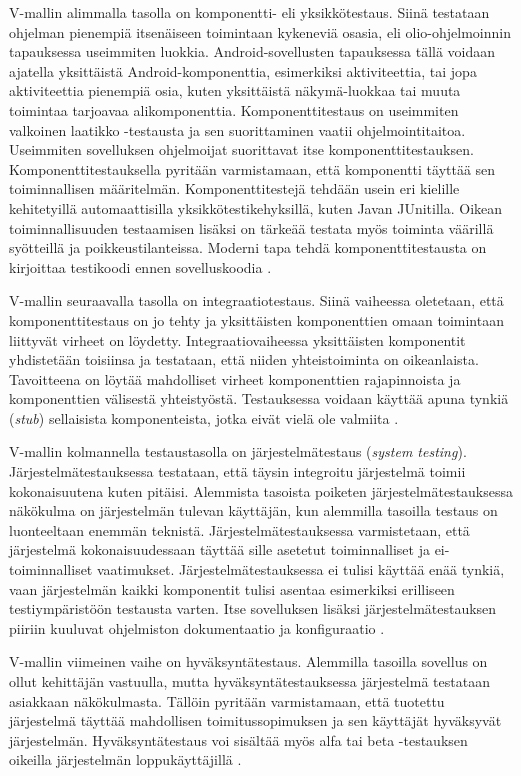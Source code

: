 V-mallin alimmalla tasolla on komponentti- eli yksikkötestaus. Siinä testataan ohjelman pienempiä itsenäiseen toimintaan kykeneviä osasia, eli olio-ohjelmoinnin tapauksessa useimmiten luokkia. Android-sovellusten tapauksessa tällä voidaan ajatella yksittäistä Android-komponenttia, esimerkiksi aktiviteettia, tai jopa aktiviteettia pienempiä osia, kuten yksittäistä näkymä-luokkaa tai muuta toimintaa tarjoavaa alikomponenttia. Komponenttitestaus on useimmiten valkoinen laatikko -testausta ja sen suorittaminen vaatii ohjelmointitaitoa. Useimmiten sovelluksen ohjelmoijat suorittavat itse komponenttitestauksen. Komponenttitestauksella pyritään varmistamaan, että komponentti täyttää sen toiminnallisen määritelmän. Komponenttitestejä tehdään usein eri kielille kehitetyillä automaattisilla yksikkötestikehyksillä, kuten Javan JUnitilla. Oikean toiminnallisuuden testaamisen lisäksi on tärkeää testata myös toiminta väärillä syötteillä ja poikkeustilanteissa. Moderni tapa tehdä komponenttitestausta on kirjoittaa testikoodi ennen sovelluskoodia \cite[43-50]{testing_foundations}.

V-mallin seuraavalla tasolla on integraatiotestaus. Siinä vaiheessa oletetaan, että komponenttitestaus on jo tehty ja yksittäisten komponenttien omaan toimintaan liittyvät virheet on löydetty. Integraatiovaiheessa yksittäisten komponentit yhdistetään toisiinsa ja testataan, että niiden yhteistoiminta on oikeanlaista. Tavoitteena on löytää mahdolliset virheet komponenttien rajapinnoista ja komponenttien välisestä yhteistyöstä. Testauksessa voidaan käyttää apuna tynkiä (\emph{stub}) sellaisista komponenteista, jotka eivät vielä ole valmiita \cite[50-52]{testing_foundations}.

V-mallin kolmannella testaustasolla on järjestelmätestaus (\emph{system testing}). Järjestelmätestauksessa testataan, että täysin integroitu järjestelmä toimii kokonaisuutena kuten pitäisi. Alemmista tasoista poiketen järjestelmätestauksessa näkökulma on järjestelmän tulevan käyttäjän, kun alemmilla tasoilla testaus on luonteeltaan enemmän teknistä. Järjestelmätestauksessa varmistetaan, että järjestelmä kokonaisuudessaan täyttää sille asetetut toiminnalliset ja ei-toiminnalliset vaatimukset. Järjestelmätestauksessa ei tulisi käyttää enää tynkiä, vaan järjestelmän kaikki komponentit tulisi asentaa esimerkiksi erilliseen testiympäristöön testausta varten. Itse sovelluksen lisäksi järjestelmätestauksen piiriin kuuluvat ohjelmiston dokumentaatio ja konfiguraatio \cite[58-61]{testing_foundations}.

V-mallin viimeinen vaihe on hyväksyntätestaus. Alemmilla tasoilla sovellus on ollut kehittäjän vastuulla, mutta hyväksyntätestauksessa järjestelmä testataan asiakkaan näkökulmasta. Tällöin pyritään varmistamaan, että tuotettu järjestelmä täyttää mahdollisen toimitussopimuksen ja sen käyttäjät hyväksyvät järjestelmän. Hyväksyntätestaus voi sisältää myös alfa tai beta -testauksen oikeilla järjestelmän loppukäyttäjillä \cite[62-63]{testing_foundations}.

